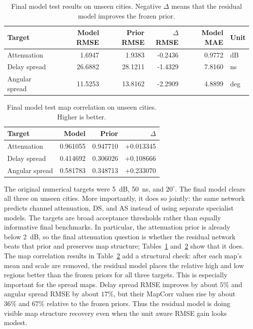 \documentclass[journal]{IEEEtran}
\begin{document}
\begin{table}[!t]
\centering
\caption{Final model test results on unseen cities. Negative \(\Delta\) means
that the residual model improves the frozen prior.}
\label{tab:main-results}
\scriptsize
\setlength{\tabcolsep}{4pt}
\begin{tabular}{lrrrrl}
\toprule
Target & Model RMSE & Prior RMSE & \(\Delta\)RMSE & Model MAE & Unit \\
\midrule
Attenuation & 1.6947 & 1.9383 & -0.2436 & 0.9772 & dB \\
Delay spread & 26.6882 & 28.1211 & -1.4329 & 7.8160 & ns \\
Angular spread & 11.5253 & 13.8162 & -2.2909 & 4.8899 & deg \\
\bottomrule
\end{tabular}
\end{table}

\begin{table}[!t]
\centering
\caption{Final model test map correlation on unseen cities. Higher is better.}
\label{tab:mapcorr}
\scriptsize
\setlength{\tabcolsep}{4pt}
\begin{tabular}{lrrr}
\toprule
Target & Model & Prior & \(\Delta\) \\
\midrule
Attenuation & 0.961055 & 0.947710 & +0.013345 \\
Delay spread & 0.414692 & 0.306026 & +0.108666 \\
Angular spread & 0.581783 & 0.348713 & +0.233070 \\
\bottomrule
\end{tabular}
\end{table}

The original numerical targets were \SI{5}{dB}, \SI{50}{ns}, and
\(20^\circ\). The final model clears all three on unseen cities. More
importantly, it does so jointly: the same network predicts channel attenuation,
DS, and AS instead of
using separate specialist models.
The targets are broad acceptance thresholds rather than equally informative
final benchmarks. In particular, the attenuation prior is already below
\SI{2}{dB}, so the final attenuation question is whether the residual network
beats that prior and preserves map structure; Tables~\ref{tab:main-results}
and~\ref{tab:mapcorr} show that it does.
The map correlation results in Table~\ref{tab:mapcorr} add a structural check:
after each map's mean and scale are removed, the residual model places the
relative high and low regions better than the frozen priors for all three
targets. This is especially important for the spread maps. Delay spread RMSE
improves by about \(5\%\) and angular spread RMSE by about \(17\%\), but their
MapCorr values rise by about \(36\%\) and \(67\%\) relative to the frozen priors.
Thus the residual model is doing visible map structure recovery even when the
unit aware RMSE gain looks modest.
\end{document}
